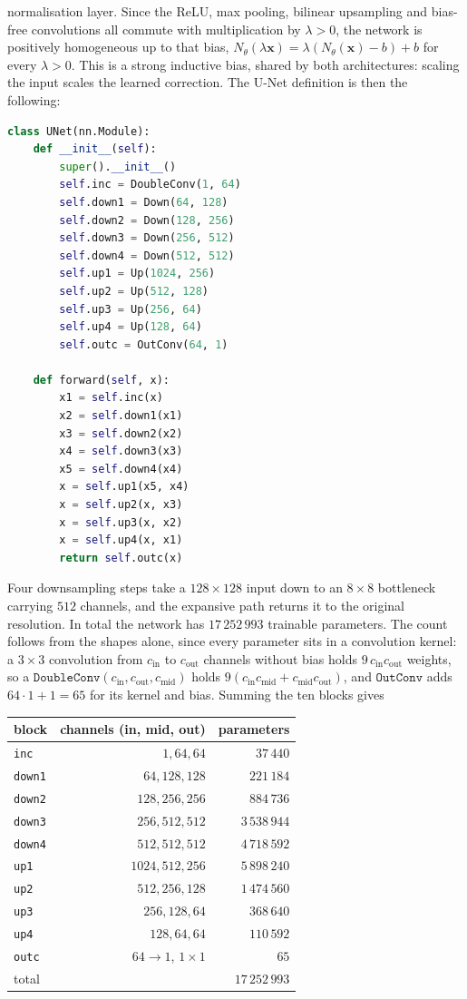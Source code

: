 \documentclass{article}
\numberwithin{equation}{section}
\begin{document}
normalisation layer. Since the ReLU, max pooling, bilinear upsampling and bias-free convolutions all
commute with multiplication by $\lambda>0$, the network is positively homogeneous up to that bias,
$N_\theta(\lambda\mathbf{x})=\lambda(N_\theta(\mathbf{x})-b)+b$ for every $\lambda>0$. This is a strong
inductive bias, shared by both architectures: scaling the input scales the learned correction.
The U-Net definition is then the following:
\begin{lstlisting}[language=Python, caption=UNET]
class UNet(nn.Module):
    def __init__(self):
        super().__init__()
        self.inc = DoubleConv(1, 64)
        self.down1 = Down(64, 128)
        self.down2 = Down(128, 256)
        self.down3 = Down(256, 512)
        self.down4 = Down(512, 512)
        self.up1 = Up(1024, 256)
        self.up2 = Up(512, 128)
        self.up3 = Up(256, 64)
        self.up4 = Up(128, 64)
        self.outc = OutConv(64, 1)

    def forward(self, x):
        x1 = self.inc(x)
        x2 = self.down1(x1)
        x3 = self.down2(x2)
        x4 = self.down3(x3)
        x5 = self.down4(x4)
        x = self.up1(x5, x4)
        x = self.up2(x, x3)
        x = self.up3(x, x2)
        x = self.up4(x, x1)
        return self.outc(x)
\end{lstlisting}
Four downsampling steps take a $128\times128$ input
down to an $8\times8$ bottleneck carrying $512$ channels, and the expansive path
returns it to the original resolution. In total the network has $17\,252\,993$
trainable parameters. The count follows from the shapes alone, since every
parameter sits in a convolution kernel: a $3\times3$ convolution from $c_\text{in}$
to $c_\text{out}$ channels without bias holds $9\,c_\text{in}c_\text{out}$
weights, so a $\texttt{DoubleConv}(c_\text{in},c_\text{out},c_\text{mid})$ holds
$9(c_\text{in}c_\text{mid}+c_\text{mid}c_\text{out})$, and $\texttt{OutConv}$
adds $64\cdot1+1=65$ for its kernel and bias. Summing the ten blocks gives
\begin{center}
\begin{tabular}{lrr}
\toprule
block & channels (in, mid, out) & parameters \\
\midrule
\texttt{inc}   & $1,64,64$        & $37\,440$ \\
\texttt{down1} & $64,128,128$     & $221\,184$ \\
\texttt{down2} & $128,256,256$    & $884\,736$ \\
\texttt{down3} & $256,512,512$    & $3\,538\,944$ \\
\texttt{down4} & $512,512,512$    & $4\,718\,592$ \\
\texttt{up1}   & $1024,512,256$   & $5\,898\,240$ \\
\texttt{up2}   & $512,256,128$    & $1\,474\,560$ \\
\texttt{up3}   & $256,128,64$     & $368\,640$ \\
\texttt{up4}   & $128,64,64$      & $110\,592$ \\
\texttt{outc}  & $64\to1$, $1\times1$ & $65$ \\
\midrule
total          &                  & $17\,252\,993$ \\
\bottomrule
\end{tabular}
\end{center}
\end{document}
